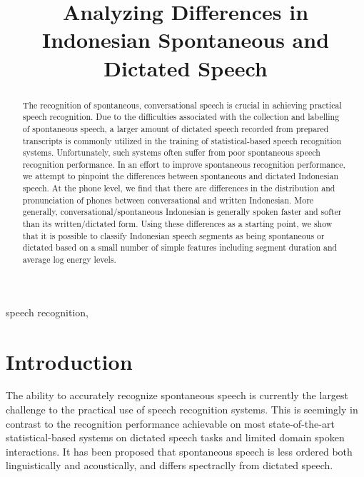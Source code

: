 \documentclass[conference]{IEEEtran}
\begin{document}
\title{Analyzing Differences in Indonesian Spontaneous and Dictated Speech}

\author {
}

\maketitle

\begin{abstract}
The recognition of spontaneous, conversational speech is crucial in achieving practical speech recognition.
Due to the difficulties associated with the collection and labelling of spontaneous speech, a larger amount of dictated speech recorded from prepared transcripts is commonly utilized in the training of statistical-based speech recognition systems.
Unfortunately, such systems often suffer from poor spontaneous speech recognition performance.
In an effort to improve spontaneous recognition performance, we attempt to pinpoint the differences between spontaneous and dictated Indonesian speech.
At the phone level, we find that there are differences in the distribution and pronunciation of phones between conversational and written Indonesian.
More generally, conversational/spontaneous Indonesian is generally spoken faster and softer than its written/dictated form.
Using these differences as a starting point, we show that it is possible to classify Indonesian speech segments as being spontaneous or dictated based on a small number of simple features including segment duration and average log energy levels.
\end{abstract}

\begin{IEEEkeywords}
speech recognition, 
\end{IEEEkeywords}

\IEEEpeerreviewmaketitle

\section{Introduction}
The ability to accurately recognize spontaneous speech is currently the largest challenge to the practical use of speech recognition systems.
This is seemingly in contrast to the recognition performance achievable on most state-of-the-art statistical-based systems on dictated speech tasks and limited domain spoken interactions.
It has been proposed that spontaneous speech is less ordered both linguistically and acoustically, and differs spectraclly from dictated speech.
\end{document}
